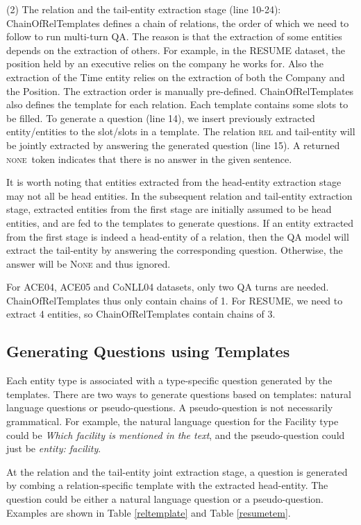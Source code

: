 \documentclass[11pt,a4paper]{article}
\newcommand{\rel}{\textsc{rel}\xspace}
\newcommand{\none}{\textsc{none}~}
\begin{document}
    (2) The relation and the tail-entity extraction stage (line 10-24): ChainOfRelTemplates defines a chain of relations, the order of which we need to follow to run multi-turn QA.  
The reason is that the extraction of some entities depends on the extraction of others. For example, in the RESUME dataset, 
 the position held by an executive relies on the company he works for. Also the extraction of the Time entity relies on the extraction of both the Company and the Position.  
The extraction order is manually pre-defined. 
ChainOfRelTemplates also defines the template for each relation.
Each template contains some slots to be filled. 
 To generate a question (line 14), we insert previously extracted entity/entities to the slot/slots in a template. 
 The relation \rel and tail-entity  will be jointly extracted by answering the generated question (line 15).
    A returned \none token indicates that there is no answer in the given sentence. 


It is worth noting that entities extracted from the head-entity extraction stage may not all be head entities. 
In the subsequent relation and tail-entity extraction stage,   extracted entities from the first stage are initially assumed to be head entities, and are fed to the templates to generate questions. If an entity  extracted from the first stage is indeed a head-entity of a relation, then the QA model will extract the tail-entity by answering the corresponding question. Otherwise, the answer will be \textsc{None} and thus ignored. 

For ACE04, ACE05 and CoNLL04 datasets, only two QA turns are needed. ChainOfRelTemplates thus only contain chains of 1.
For RESUME, we need to extract 4 entities, so ChainOfRelTemplates contain chains of 3. 

\subsection{Generating Questions using Templates}
Each entity type is associated with a type-specific question generated by the templates. 
There are two ways to generate questions based on templates: 
natural language questions or pseudo-questions. A pseudo-question is not necessarily grammatical. 
For example, the natural language question for the Facility type could be  {\it Which  facility  is  mentioned  in  the  text}, and the 
pseudo-question could just be {\it entity: facility}. 

At the relation and the tail-entity joint extraction stage, a question is generated 
by combing a relation-specific template with 
 the extracted head-entity.
 The question could be either a natural language question or a 
pseudo-question. 
Examples are shown in Table \ref{reltemplate} and Table \ref{resumetem}.
\end{document}
